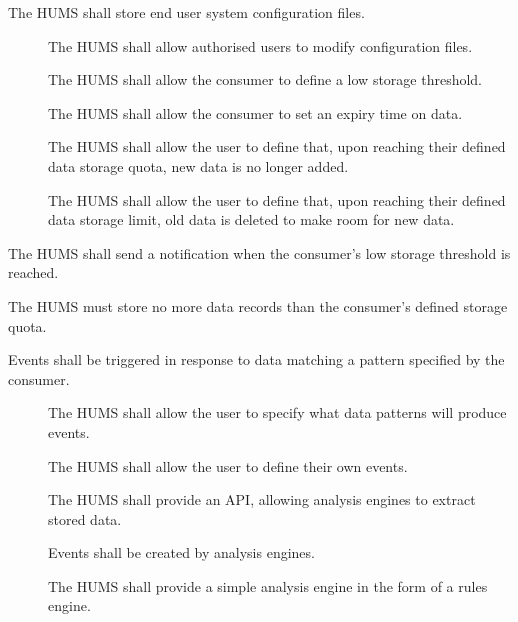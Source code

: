 \begin{description}
\begin{description}
	  \end{description}
	 \item[\fr{4}] The HUMS shall store end user system configuration 
			files.
	 \begin{description}
	  	\item[] The HUMS shall allow authorised users to modify
 		configuration files. 
		 \item[] The HUMS shall allow the consumer to define a 	
			low storage threshold.
		  \item[] The HUMS shall allow the consumer to set an 
			expiry time on data.
		  \item[] The HUMS shall allow the user to define that, 
			upon reaching their defined data storage quota, new data is 
			no longer added.
		 \item[] The HUMS shall allow the user to define that, 
			upon reaching their defined data storage limit, old data is 
			deleted to make room for new data.
	\end{description}
	 \item[\fr{5}] The HUMS shall send a notification when the consumer's 
		low storage threshold is reached.
	  \item[\fr{6}] The HUMS must store no more data records than the 	
		consumer's defined storage quota.
	\item[\fr{7}]Events shall be triggered in response to data matching a pattern 
	specified by the consumer.
		  \begin{description}
			 \item[]  The HUMS shall allow the user to specify 	
			what data patterns will produce events.
			 \item[] The HUMS shall allow the user to define their
 			own events.
 			\item[] The HUMS shall provide an API, 			
			allowing analysis engines to extract stored data.
			\item[] Events shall be created by analysis engines.
 			\item[] The HUMS shall provide a simple analysis 	
			engine in the form of a rules engine.
	\end{description}
	

\end{description}
